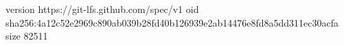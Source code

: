 version https://git-lfs.github.com/spec/v1
oid sha256:4a12c52e2969c890ab039b28fd40b126939e2ab14476e8fd8a5dd311ec30acfa
size 82511
